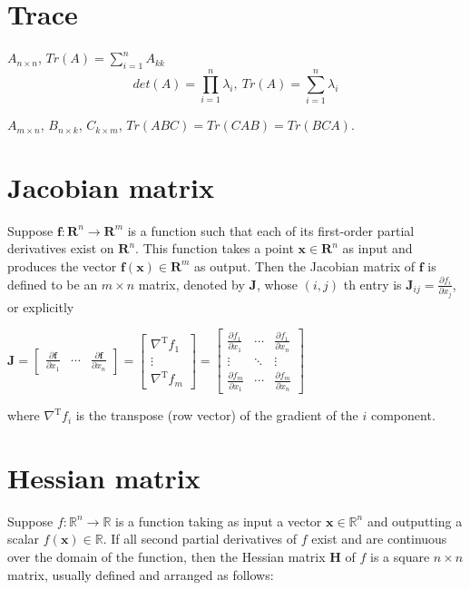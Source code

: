 \documentclass[11pt]{elegantbook}
\begin{document}
\section{Trace}
$A_{n\times n}$, $Tr(A)=\sum_{i=1}^nA_{kk}$
$$det(A)=\prod_{i=1}^n\lambda_i,\ Tr(A)=\sum_{i=1}^n\lambda_i$$
\begin{proposition}
$A_{m\times n}$, $B_{n\times k}$, $C_{k\times m}$, $Tr(ABC)=Tr(CAB)=Tr(BCA)$.
\end{proposition}






\section{Jacobian matrix}
Suppose $\mathbf{f}: \mathbf{R}^{n} \rightarrow \mathbf{R}^{m}$ is a function such that each of its first-order partial derivatives exist on $\mathbf{R}^{n}.$ This function takes a point $\mathbf{x} \in \mathbf{R}^{n}$ as input and produces the vector $\mathbf{f}(\mathbf{x}) \in \mathbf{R}^{m}$ as output. Then the Jacobian matrix of $\mathbf{f}$ is defined to be an $m \times n$ matrix, denoted by $\mathbf{J}$, whose $(i, j)$ th entry is $\mathbf{J}_{i j}=\frac{\partial f_{i}}{\partial x_{j}}$, or explicitly

$
\mathbf{J}=\left[\begin{array}{ccc}
\frac{\partial \mathbf{f}}{\partial x_{1}} & \cdots & \frac{\partial \mathbf{f}}{\partial x_{n}}
\end{array}\right]=\left[\begin{array}{c}
\nabla^{\mathrm{T}} f_{1} \\
\vdots \\
\nabla^{\mathrm{T}} f_{m}
\end{array}\right]=\left[\begin{array}{ccc}
\frac{\partial f_{1}}{\partial x_{1}} & \cdots & \frac{\partial f_{1}}{\partial x_{n}} \\
\vdots & \ddots & \vdots \\
\frac{\partial f_{m}}{\partial x_{1}} & \cdots & \frac{\partial f_{m}}{\partial x_{n}}
\end{array}\right]
$

where $\nabla^{\mathrm{T}} f_{i}$ is the transpose (row vector) of the gradient of the $i$ component.

\section{Hessian matrix}
Suppose $f: \mathbb{R}^{n} \rightarrow \mathbb{R}$ is a function taking as input a vector $\mathbf{x} \in \mathbb{R}^{n}$ and outputting a scalar $f(\mathbf{x}) \in \mathbb{R}$. If all second partial derivatives of $f$ exist and are continuous over the domain of the function, then the Hessian matrix $\mathbf{H}$ of $f$ is a square $n \times n$ matrix, usually defined and arranged as follows:
\end{document}
